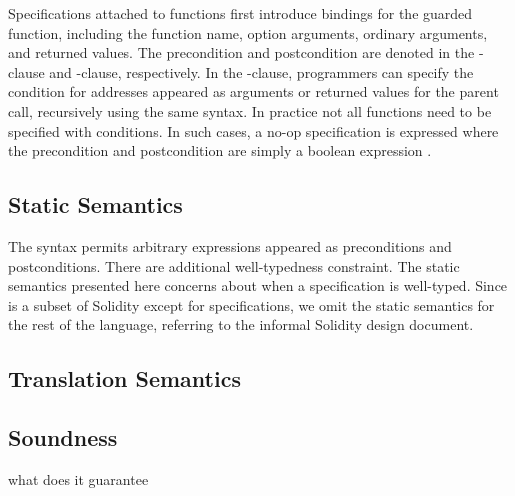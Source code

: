 Specifications attached to functions first introduce bindings for the guarded
function, including the function name, option arguments, ordinary arguments,
and returned values.
The precondition and postcondition are denoted in the -clause and
-clause, respectively.
In the -clause, programmers can specify the condition for addresses
appeared as arguments or returned values for the parent call, recursively using
the same syntax.
In practice not all functions need to be specified with conditions.
In such cases, a no-op specification is expressed where the precondition and
postcondition are simply a boolean expression .

\subsection{Static Semantics}

The syntax permits arbitrary expressions appeared as preconditions and
postconditions. There are additional well-typedness constraint.
The static semantics presented here concerns about when a specification is
well-typed.
Since \corelang is a subset of Solidity except for specifications, we omit the
static semantics for the rest of the language, referring to the informal
Solidity design document.


\subsection{Translation Semantics}

\subsection{Soundness}

what does it guarantee

